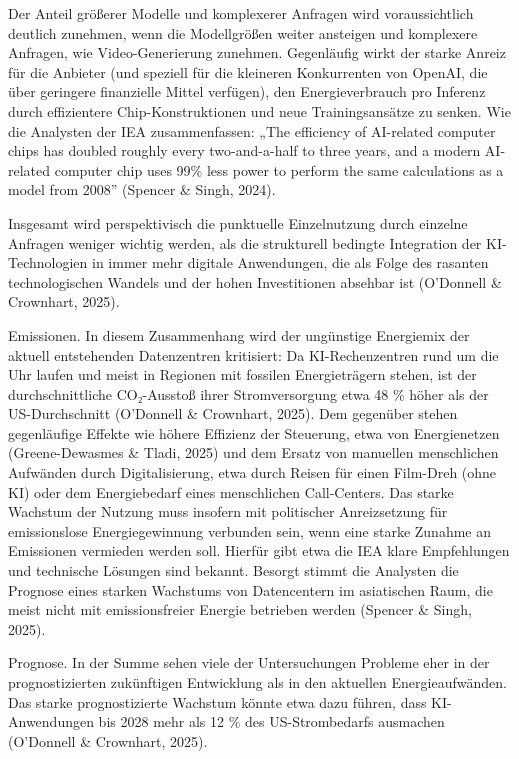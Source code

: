 \documentclass[
  ngerman,
  letterpaper,
  DIV=11]{scrreprt}
\begin{document}
Der Anteil größerer Modelle und komplexerer Anfragen wird
voraussichtlich deutlich zunehmen, wenn die Modellgrößen weiter
ansteigen und komplexere Anfragen, wie Video-Generierung zunehmen.
Gegenläufig wirkt der starke Anreiz für die Anbieter (und speziell für
die kleineren Konkurrenten von OpenAI, die über geringere finanzielle
Mittel verfügen), den Energieverbrauch pro Inferenz durch effizientere
Chip-Konstruktionen und neue Trainingsansätze zu senken. Wie die
Analysten der IEA zusammenfassen: „The efficiency of AI-related computer
chips has doubled roughly every two-and-a-half to three years, and a
modern AI-related computer chip uses 99\% less power to perform the same
calculations as a model from 2008'' (Spencer \& Singh, 2024).

Insgesamt wird perspektivisch die punktuelle Einzelnutzung durch
einzelne Anfragen weniger wichtig werden, als die strukturell bedingte
Integration der KI-Technologien in immer mehr digitale Anwendungen, die
als Folge des rasanten technologischen Wandels und der hohen
Investitionen absehbar ist (O'Donnell \& Crownhart, 2025).

Emissionen. In diesem Zusammenhang wird der ungünstige Energiemix der
aktuell entstehenden Datenzentren kritisiert: Da KI-Rechenzentren rund
um die Uhr laufen und meist in Regionen mit fossilen Energieträgern
stehen, ist der durchschnittliche CO₂-Ausstoß ihrer Stromversorgung etwa
48 \% höher als der US-Durchschnitt (O'Donnell \& Crownhart, 2025). Dem
gegenüber stehen gegenläufige Effekte wie höhere Effizienz der
Steuerung, etwa von Energienetzen (Greene-Dewasmes \& Tladi, 2025) und
dem Ersatz von manuellen menschlichen Aufwänden durch Digitalisierung,
etwa durch Reisen für einen Film-Dreh (ohne KI) oder dem Energiebedarf
eines menschlichen Call-Centers. Das starke Wachstum der Nutzung muss
insofern mit politischer Anreizsetzung für emissionslose
Energiegewinnung verbunden sein, wenn eine starke Zunahme an Emissionen
vermieden werden soll. Hierfür gibt etwa die IEA klare Empfehlungen und
technische Lösungen sind bekannt. Besorgt stimmt die Analysten die
Prognose eines starken Wachstums von Datencentern im asiatischen Raum,
die meist nicht mit emissionsfreier Energie betrieben werden (Spencer \&
Singh, 2025).

Prognose. In der Summe sehen viele der Untersuchungen Probleme eher in
der prognostizierten zukünftigen Entwicklung als in den aktuellen
Energieaufwänden. Das starke prognostizierte Wachstum könnte etwa dazu
führen, dass KI-Anwendungen bis 2028 mehr als 12 \% des US-Strombedarfs
ausmachen (O'Donnell \& Crownhart, 2025).
\end{document}
